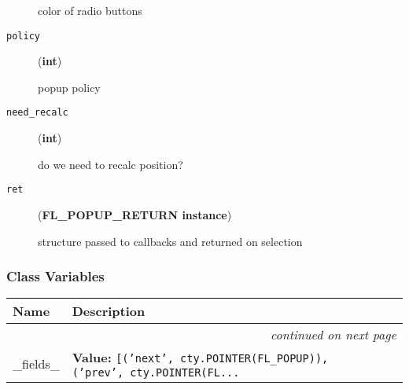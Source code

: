 \begin{description}
color of radio buttons

\item[{\texttt{policy}}] \leavevmode (\textbf{int})

popup policy

\item[{\texttt{need\_recalc}}] \leavevmode (\textbf{int})

do we need to recalc position?

\item[{\texttt{ret}}] \leavevmode (\textbf{FL\_POPUP\_RETURN instance})

structure passed to callbacks and returned on selection

\end{description}




  \subsubsection{Class Variables}

    \vspace{-1cm}
\hspace{\varindent}\begin{longtable}{|p{\varnamewidth}|p{\vardescrwidth}|l}
\cline{1-2}
\cline{1-2} \centering \textbf{Name} & \centering \textbf{Description}& \\
\cline{1-2}
\endhead\cline{1-2}\multicolumn{3}{r}{\small\textit{continued on next page}}\\\endfoot\cline{1-2}
\endlastfoot\raggedright \_\-f\-i\-e\-l\-d\-s\-\_\- & \raggedright \textbf{Value:} 
{\tt [('next', cty.POINTER(FL\_POPUP)), ('prev', cty.POINTER(FL\texttt{...}}&\\
\cline{1-2}
\end{longtable}



